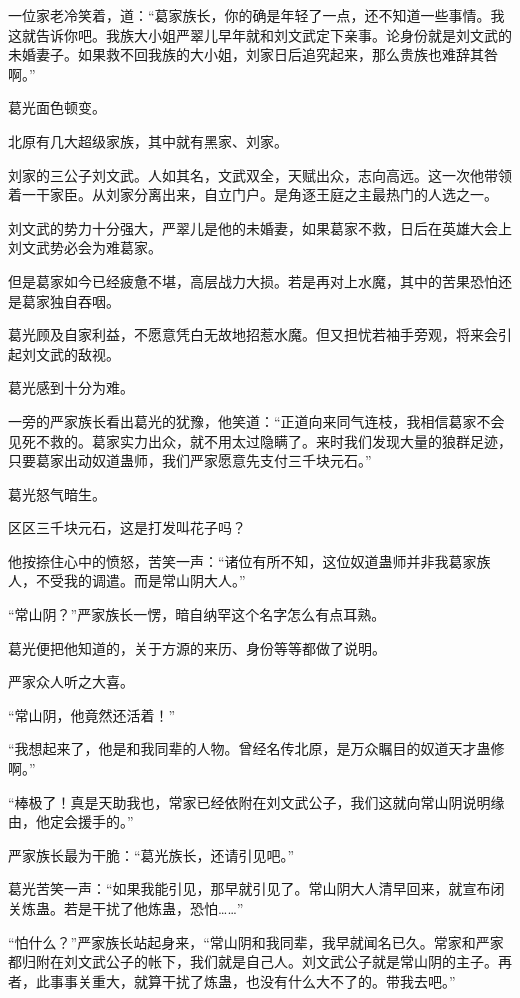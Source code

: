 \begin{this_body}
一位家老冷笑着，道：“葛家族长，你的确是年轻了一点，还不知道一些事情。我这就告诉你吧。我族大小姐严翠儿早年就和刘文武定下亲事。论身份就是刘文武的未婚妻子。如果救不回我族的大小姐，刘家日后追究起来，那么贵族也难辞其咎啊。”

葛光面色顿变。

北原有几大超级家族，其中就有黑家、刘家。

刘家的三公子刘文武。人如其名，文武双全，天赋出众，志向高远。这一次他带领着一干家臣。从刘家分离出来，自立门户。是角逐王庭之主最热门的人选之一。

刘文武的势力十分强大，严翠儿是他的未婚妻，如果葛家不救，日后在英雄大会上刘文武势必会为难葛家。

但是葛家如今已经疲惫不堪，高层战力大损。若是再对上水魔，其中的苦果恐怕还是葛家独自吞咽。

葛光顾及自家利益，不愿意凭白无故地招惹水魔。但又担忧若袖手旁观，将来会引起刘文武的敌视。

葛光感到十分为难。

一旁的严家族长看出葛光的犹豫，他笑道：“正道向来同气连枝，我相信葛家不会见死不救的。葛家实力出众，就不用太过隐瞒了。来时我们发现大量的狼群足迹，只要葛家出动奴道蛊师，我们严家愿意先支付三千块元石。”

葛光怒气暗生。

区区三千块元石，这是打发叫花子吗？

他按捺住心中的愤怒，苦笑一声：“诸位有所不知，这位奴道蛊师并非我葛家族人，不受我的调遣。而是常山阴大人。”

“常山阴？”严家族长一愣，暗自纳罕这个名字怎么有点耳熟。

葛光便把他知道的，关于方源的来历、身份等等都做了说明。

严家众人听之大喜。

“常山阴，他竟然还活着！”

“我想起来了，他是和我同辈的人物。曾经名传北原，是万众瞩目的奴道天才蛊修啊。”

“棒极了！真是天助我也，常家已经依附在刘文武公子，我们这就向常山阴说明缘由，他定会援手的。”

严家族长最为干脆：“葛光族长，还请引见吧。”

葛光苦笑一声：“如果我能引见，那早就引见了。常山阴大人清早回来，就宣布闭关炼蛊。若是干扰了他炼蛊，恐怕……”

“怕什么？”严家族长站起身来，“常山阴和我同辈，我早就闻名已久。常家和严家都归附在刘文武公子的帐下，我们就是自己人。刘文武公子就是常山阴的主子。再者，此事事关重大，就算干扰了炼蛊，也没有什么大不了的。带我去吧。”


\end{this_body}

